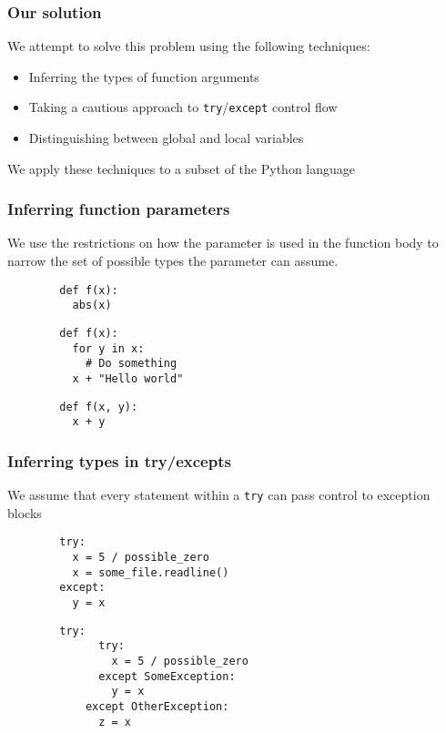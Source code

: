 \documentclass{beamer}
\begin{document}
  \begin{frame}
    \frametitle{Our solution}
    We attempt to solve this problem using the following techniques: \\
    \begin{itemize}
    		\item Inferring the types of function arguments
    		\item Taking a cautious approach to \texttt{try}/\texttt{except} control flow
    		\item Distinguishing between global and local variables
    \end{itemize}
    We apply these techniques to a subset of the Python language
  \end{frame}


\begin{frame}[fragile]
    \frametitle{Inferring function parameters}
    \begin{block}{}
    We use the restrictions on how the parameter is used in the function body to narrow the set of possible types the parameter can assume.
    \end{block}
    
    \begin{block}{}
    \begin{lstlisting}
        def f(x):
          abs(x)
    \end{lstlisting}
    \begin{lstlisting}
        def f(x):
          for y in x:
            # Do something
          x + "Hello world"
    \end{lstlisting}
    \begin{lstlisting}
        def f(x, y):
          x + y
    \end{lstlisting}
    \end{block}
\end{frame}
 
  
\begin{frame}[fragile]
    \frametitle{Inferring types in try/excepts}
    We assume that every statement within a \texttt{try} can pass control to exception blocks

    \begin{lstlisting}
        try:
          x = 5 / possible_zero
          x = some_file.readline()
        except:
          y = x
    \end{lstlisting}
    \begin{lstlisting}
        try:
        	  try:
        	    x = 5 / possible_zero
        	  except SomeException:
        	    y = x
        	except OtherException:
        	  z = x
    \end{lstlisting}
\end{frame}
\end{document}

